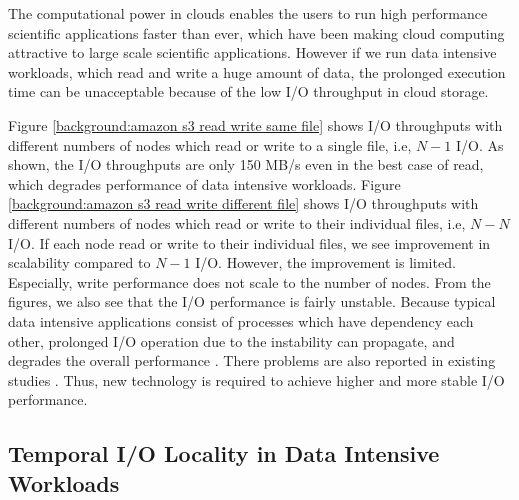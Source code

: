 The computational power in clouds enables the users to run high performance
scientific applications faster than ever, which have been making cloud
computing attractive to large scale scientific applications.
However if we run data intensive workloads, which read and write a huge amount
of data, the prolonged execution time can be unacceptable because of the low I/O
throughput in cloud storage.
\par
{}
Figure \ref{background:amazon s3 read write same file} shows I/O throughputs
with different numbers of nodes which read or write to a single file, i.e, $N-1$ I/O. 
As shown, the I/O throughputs are only 150 MB/s even in the best case of read,
which degrades performance of data intensive workloads. 
Figure \ref{background:amazon s3 read write different file} shows I/O
throughputs with different numbers of nodes which read or write to their
individual files, i.e, $N-N$ I/O. If each node read or write to their individual
files, we see improvement in scalability compared to $N-1$ I/O. 
However, the improvement is limited. Especially, write performance does not
scale to the number of nodes. From the figures, we also see that the I/O
performance is fairly unstable. Because typical data intensive applications consist of
processes which have dependency each other, prolonged I/O
operation due to the instability can propagate, and degrades the overall
performance \cite{montage, povray}.
There problems are also reported in existing studies \cite{Chiba,Transactions_a_la_carte, Interactive_Use_of_Cloud_Services,Amazon_S3_for_Science_Grids,
anevaluation}. 
Thus, new technology is required to achieve higher and more stable I/O
performance.

 



\subsection{Temporal I/O Locality in Data Intensive Workloads}
\label{ssec:data_access_locality}

